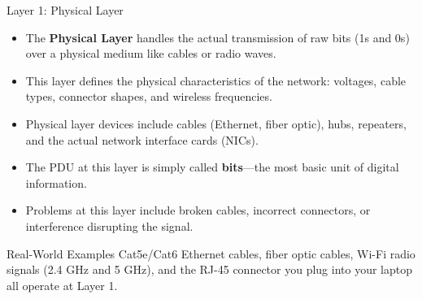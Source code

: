 \documentclass[aspectratio=169]{beamer}
\begin{document}
\begin{frame}{Layer 1: Physical Layer}

\begin{itemize}
    \item The \textbf{Physical Layer} handles the actual transmission of raw bits (1s and 0s) over a physical medium like cables or radio waves.
    \item This layer defines the physical characteristics of the network: voltages, cable types, connector shapes, and wireless frequencies.
    \item Physical layer devices include cables (Ethernet, fiber optic), hubs, repeaters, and the actual network interface cards (NICs).
    \item The PDU at this layer is simply called \textbf{bits}—the most basic unit of digital information.
    \item Problems at this layer include broken cables, incorrect connectors, or interference disrupting the signal.
\end{itemize}

\vspace{0.3cm}

\begin{alertblock}{Real-World Examples}
Cat5e/Cat6 Ethernet cables, fiber optic cables, Wi-Fi radio signals (2.4 GHz and 5 GHz), and the RJ-45 connector you plug into your laptop all operate at Layer 1.
\end{alertblock}

\end{frame}
\end{document}
